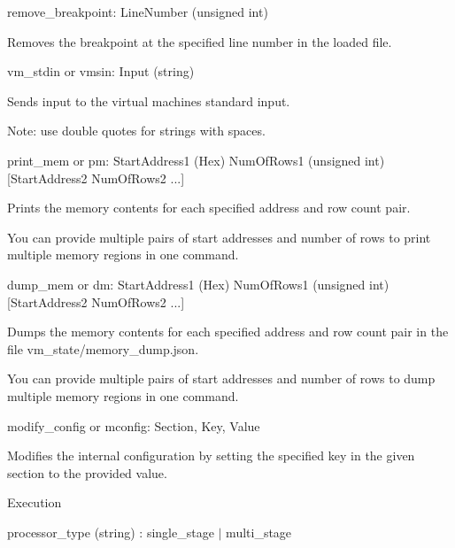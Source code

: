 \begin{DoxyItemize}
\item {\ttfamily remove\+\_\+breakpoint}\+: {\ttfamily Line\+Number} (unsigned int)
\begin{DoxyItemize}
\item Removes the breakpoint at the specified line number in the loaded file.
\end{DoxyItemize}
\item {\ttfamily vm\+\_\+stdin} or {\ttfamily vmsin}\+: {\ttfamily Input} (string)
\begin{DoxyItemize}
\item Sends input to the virtual machine\textquotesingle{}s standard input.
\item Note\+: use double quotes for strings with spaces.
\end{DoxyItemize}
\item {\ttfamily print\+\_\+mem} or {\ttfamily pm}\+: {\ttfamily Start\+Address1} (Hex) {\ttfamily Num\+Of\+Rows1} (unsigned int) \mbox{[}{\ttfamily Start\+Address2} {\ttfamily Num\+Of\+Rows2} ...\mbox{]}
\begin{DoxyItemize}
\item Prints the memory contents for each specified address and row count pair.
\item You can provide multiple pairs of start addresses and number of rows to print multiple memory regions in one command.
\end{DoxyItemize}
\item {\ttfamily dump\+\_\+mem} or {\ttfamily dm}\+: {\ttfamily Start\+Address1} (Hex) {\ttfamily Num\+Of\+Rows1} (unsigned int) \mbox{[}{\ttfamily Start\+Address2} {\ttfamily Num\+Of\+Rows2} ...\mbox{]}
\begin{DoxyItemize}
\item Dumps the memory contents for each specified address and row count pair in the file {\ttfamily vm\+\_\+state/memory\+\_\+dump.\+json}.
\item You can provide multiple pairs of start addresses and number of rows to dump multiple memory regions in one command.
\end{DoxyItemize}
\item {\ttfamily modify\+\_\+config} or {\ttfamily mconfig}\+: {\ttfamily Section}, {\ttfamily Key}, {\ttfamily Value}
\begin{DoxyItemize}
\item Modifies the internal configuration by setting the specified key in the given section to the provided value.
\item {\ttfamily Execution}
\begin{DoxyItemize}
\item {\ttfamily processor\+\_\+type} (string) \+: {\ttfamily single\+\_\+stage} \texorpdfstring{$\vert$}{|} {\ttfamily multi\+\_\+stage} ~\newline


\end{DoxyItemize}
\end{DoxyItemize}
\end{DoxyItemize}
